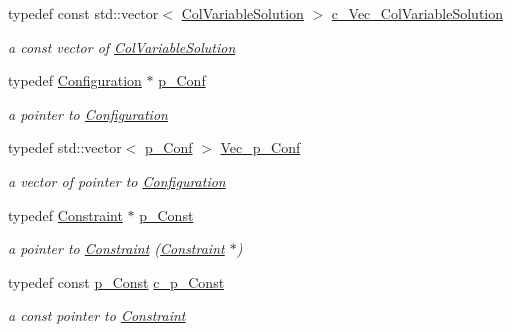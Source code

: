 \begin{DoxyCompactItemize}
typedef const std\+::vector$<$ \mbox{\hyperlink{class_s_m_spp__di__unipi__it_1_1_col_variable_solution}{Col\+Variable\+Solution}} $>$ \mbox{\hyperlink{group___col_variable_solution___t_y_p_e_s_gac9f0485d8cd9fac29d0b83dbc3242c0e}{c\+\_\+\+Vec\+\_\+\+Col\+Variable\+Solution}}
\begin{DoxyCompactList}\small\item\em a const vector of \mbox{\hyperlink{class_s_m_spp__di__unipi__it_1_1_col_variable_solution}{Col\+Variable\+Solution}} \end{DoxyCompactList}\item 
typedef \mbox{\hyperlink{class_s_m_spp__di__unipi__it_1_1_configuration}{Configuration}} $\ast$ \mbox{\hyperlink{group___configuration___t_y_p_e_s_gae822ccc553e79ddf75bfd260c2b995f3}{p\+\_\+\+Conf}}
\begin{DoxyCompactList}\small\item\em a pointer to \mbox{\hyperlink{class_s_m_spp__di__unipi__it_1_1_configuration}{Configuration}} \end{DoxyCompactList}\item 
typedef std\+::vector$<$ \mbox{\hyperlink{group___configuration___t_y_p_e_s_gae822ccc553e79ddf75bfd260c2b995f3}{p\+\_\+\+Conf}} $>$ \mbox{\hyperlink{group___configuration___t_y_p_e_s_ga691b40b20a13a75546e21eb39beb512a}{Vec\+\_\+p\+\_\+\+Conf}}
\begin{DoxyCompactList}\small\item\em a vector of pointer to \mbox{\hyperlink{class_s_m_spp__di__unipi__it_1_1_configuration}{Configuration}} \end{DoxyCompactList}\item 
typedef \mbox{\hyperlink{class_s_m_spp__di__unipi__it_1_1_constraint}{Constraint}} $\ast$ \mbox{\hyperlink{group___constraint___t_y_p_e_s_gae2abae1fd3e9370e1c0cc9dfbb4d6718}{p\+\_\+\+Const}}
\begin{DoxyCompactList}\small\item\em a pointer to \mbox{\hyperlink{class_s_m_spp__di__unipi__it_1_1_constraint}{Constraint}} (\mbox{\hyperlink{class_s_m_spp__di__unipi__it_1_1_constraint}{Constraint}} $\ast$) \end{DoxyCompactList}\item 
typedef const \mbox{\hyperlink{group___constraint___t_y_p_e_s_gae2abae1fd3e9370e1c0cc9dfbb4d6718}{p\+\_\+\+Const}} \mbox{\hyperlink{group___constraint___t_y_p_e_s_ga9c035399735cd8e147d1f912ba79a1c2}{c\+\_\+p\+\_\+\+Const}}
\begin{DoxyCompactList}\small\item\em a const pointer to \mbox{\hyperlink{class_s_m_spp__di__unipi__it_1_1_constraint}{Constraint}} \end{DoxyCompactList}\item 

\end{DoxyCompactItemize}
